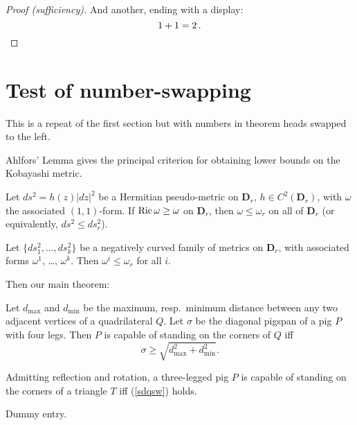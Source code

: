 \begin{proof}[Proof \textup(sufficiency\textup)]
And another, ending with a display:
\[
1+1=2\,. \qedhere
\]
\end{proof}

\section{Test of number-swapping}

This is a repeat of the first section but with numbers in theorem heads
swapped to the left.

Ahlfors' Lemma gives the principal criterion for obtaining lower bounds
on the Kobayashi metric.
\begin{Ahlfors}
Let $ds^2 = h(z)\lvert dz\rvert^2$ be a Hermitian pseudo-metric on
$\mathbf{D}_r$, $h\in C^2(\mathbf{D}_r)$, with $\omega$ the associated
$(1,1)$-form. If $\mathop{\mathrm{Ric}}\nolimits\omega\geq\omega$ on $\mathbf{D}_r$,
then $\omega\leq\omega_r$ on all of $\mathbf{D}_r$ (or equivalently,
$ds^2\leq ds_r^2$).
\end{Ahlfors}

\begin{lemsw}
Let $\{ds_1^2,\dots,ds_k^2\}$ be a negatively curved family of metrics
on $\mathbf{D}_r$, with associated forms $\omega^1$, \dots, $\omega^k$.
Then $\omega^i \leq\omega_r$ for all $i$.
\end{lemsw}

Then our main theorem:
\begin{thmsw}
Let $d_{\max}$ and $d_{\min}$ be the maximum, resp.\ minimum distance
between any two adjacent vertices of a quadrilateral $Q$. Let $\sigma$
be the diagonal pigspan of a pig $P$ with four legs.
Then $P$ is capable of standing on the corners of $Q$ iff
\begin{equation}\label{sdqsw}
\sigma\geq \sqrt{d_{\max}^2+d_{\min}^2}.
\end{equation}
\end{thmsw}

\begin{corsw}
Admitting reflection and rotation, a three-legged pig $P$ is capable of
standing on the corners of a triangle $T$ iff (\ref{sdqsw}) holds.
\end{corsw}

\begin{thebibliography}{99}
 Dummy entry.
\end{thebibliography}


